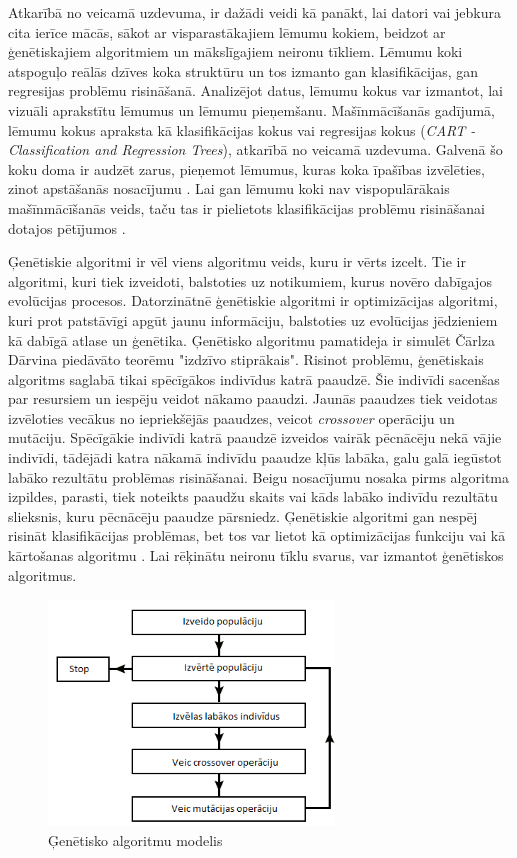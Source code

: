 Atkarībā no veicamā uzdevuma, ir dažādi veidi kā panākt, lai datori vai jebkura cita ierīce mācās, sākot ar visparastākajiem lēmumu kokiem, beidzot ar ģenētiskajiem algoritmiem un mākslīgajiem neironu tīkliem. Lēmumu koki atspoguļo reālās dzīves koka struktūru un tos izmanto gan klasifikācijas, gan regresijas problēmu risināšanā. Analizējot datus, lēmumu kokus var izmantot, lai vizuāli aprakstītu lēmumus un lēmumu pieņemšanu. Mašīnmācīšanās gadījumā, lēmumu kokus apraksta kā klasifikācijas kokus vai regresijas kokus (\textit{CART - Classification and Regression Trees}), atkarībā no veicamā uzdevuma.  Galvenā šo koku doma ir audzēt zarus, pieņemot lēmumus, kuras koka īpašības izvēlēties, zinot apstāšanās nosacījumu \cite{dectree}. Lai gan lēmumu koki nav vispopulārākais mašīnmācīšanās veids, taču tas ir pielietots klasifikācijas problēmu risināšanai dotajos pētījumos \cite{dectreepaper}\cite{pal2003assessment}.

Ģenētiskie algoritmi ir vēl viens algoritmu veids, kuru ir vērts izcelt. Tie ir algoritmi, kuri tiek izveidoti, balstoties uz notikumiem, kurus novēro dabīgajos evolūcijas procesos. Datorzinātnē ģenētiskie algoritmi ir optimizācijas algoritmi, kuri prot patstāvīgi apgūt jaunu informāciju, balstoties uz evolūcijas jēdzieniem kā dabīgā atlase un ģenētika. Ģenētisko algoritmu pamatideja ir simulēt Čārlza Dārvina piedāvāto teorēmu "izdzīvo stiprākais". Risinot problēmu, ģenētiskais algoritms saglabā tikai spēcīgākos indivīdus katrā paaudzē. Šie indivīdi sacenšas par resursiem un iespēju veidot nākamo paaudzi. Jaunās paaudzes tiek veidotas izvēloties vecākus no iepriekšējās paaudzes, veicot \textit{crossover} operāciju un mutāciju. Spēcīgākie indivīdi katrā paaudzē izveidos vairāk pēcnācēju nekā vājie indivīdi, tādējādi katra nākamā indivīdu paaudze kļūs labāka, galu galā iegūstot labāko rezultātu problēmas risināšanai. Beigu nosacījumu nosaka pirms algoritma izpildes, parasti, tiek noteikts paaudžu skaits vai kāds labāko indivīdu rezultātu slieksnis, kuru pēcnācēju paaudze pārsniedz. Ģenētiskie algoritmi gan nespēj risināt klasifikācijas problēmas, bet tos var lietot kā optimizācijas funkciju \cite{genopti} vai kā kārtošanas algoritmu \cite{deb2000fast}. Lai rēķinātu neironu tīklu svarus, var izmantot ģenētiskos algoritmus. \cite{genalg}
\begin{figure}[h]%
	\centering
	\includegraphics[height=6cm]{images/gen-algo-bilde.png} %
	\caption{Ģenētisko algoritmu modelis}%
	\label{fig:example}%
\end{figure}

